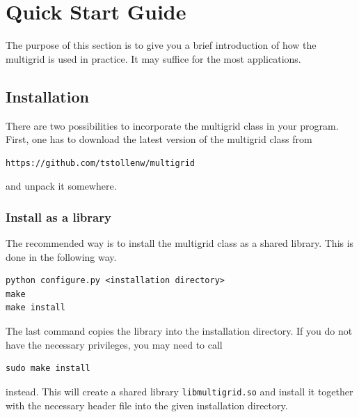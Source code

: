 \chapter{Quick Start Guide}\label{chapter:quick_start_guide}
The purpose of this section is to give you a brief introduction of how the multigrid is used in practice. It may suffice for the most applications.

\section{Installation}
There are two possibilities to incorporate the multigrid class in your program. First, one has to download the latest version of the multigrid class from	
\begin{lstlisting}[language=bash]
https://github.com/tstollenw/multigrid
\end{lstlisting}
and unpack it somewhere. 
\subsection{Install as a library}
The recommended way is to install the multigrid class as a shared library. This is done in the following way.
\begin{lstlisting}
python configure.py <installation directory>
make
make install
\end{lstlisting}
The last command copies the library into the installation directory. If you do not have the necessary privileges, you may need to call
\begin{lstlisting}
sudo make install
\end{lstlisting}
instead. This will create a shared library \texttt{libmultigrid.so} and install it together with the necessary header file into the given installation directory.

